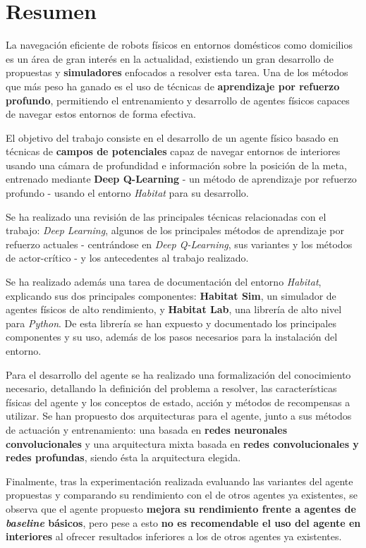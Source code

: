 \chapter*{Resumen}

La navegación eficiente de robots físicos en entornos domésticos como domicilios es un área de gran interés en la actualidad, existiendo un gran desarrollo de propuestas y \textbf{simuladores} enfocados a resolver esta tarea. Una de los métodos que más peso ha ganado es el uso de técnicas de \textbf{aprendizaje por refuerzo profundo}, permitiendo el entrenamiento y desarrollo de agentes físicos capaces de navegar estos entornos de forma efectiva.

El objetivo del trabajo consiste en el desarrollo de un agente físico basado en técnicas de \textbf{campos de potenciales} capaz de navegar entornos de interiores usando una cámara de profundidad e información sobre la posición de la meta, entrenado mediante \textbf{Deep Q-Learning} - un método de aprendizaje por refuerzo profundo - usando el entorno \textit{Habitat} para su desarrollo.

Se ha realizado una revisión de las principales técnicas relacionadas con el trabajo: \textit{Deep Learning}, algunos de los principales métodos de aprendizaje por refuerzo actuales - centrándose en \textit{Deep Q-Learning}, sus variantes y los métodos de actor-crítico - y los antecedentes al trabajo realizado.

Se ha realizado además una tarea de documentación del entorno \textit{Habitat}, explicando sus dos principales componentes: \textbf{Habitat Sim}, un simulador de agentes físicos de alto rendimiento, y \textbf{Habitat Lab}, una librería de alto nivel para \textit{Python}. De esta librería se han expuesto y documentado los principales componentes y su uso, además de los pasos necesarios para la instalación del entorno.

Para el desarrollo del agente se ha realizado una formalización del conocimiento necesario, detallando la definición del problema a resolver, las características físicas del agente y los conceptos de estado, acción y métodos de recompensas a utilizar. Se han propuesto dos arquitecturas para el agente, junto a sus métodos de actuación y entrenamiento: una basada en \textbf{redes neuronales convolucionales} y una arquitectura mixta basada en \textbf{redes convolucionales y redes profundas}, siendo ésta la arquitectura elegida.

Finalmente, tras la experimentación realizada evaluando las variantes del agente propuestas y comparando su rendimiento con el de otros agentes ya existentes, se observa que el agente propuesto \textbf{mejora su rendimiento frente a agentes de \textit{baseline} básicos}, pero pese a esto \textbf{no es recomendable el uso del agente en interiores} al ofrecer resultados inferiores a los de otros agentes ya existentes.

